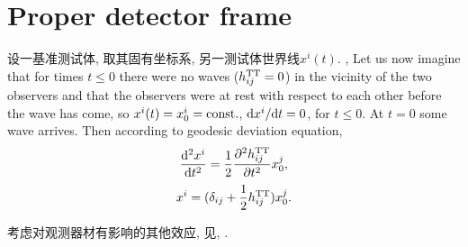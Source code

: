 \section{Proper detector frame}

设一基准测试体, 取其固有坐标系, 另一测试体世界线$x^{i}(t)$. \cite{Jaranowski2009}, Let us now imagine that for times $t \le 0$ there were no waves ($h^\text{TT}_{ij} = 0$) in the vicinity of the two observers and that the observers were at rest with respect to each other before the wave has come, so $x^i(t) = x^i_0 = \text{const.}$, $\mathrm{d} x^i/\mathrm{d} t = 0$, for $t \le 0$. At $t = 0$ some wave arrives. Then according to geodesic deviation equation,
\begin{equation}
    \frac{\mathrm{d}^2x^i}{\mathrm{d} t^2}=\frac{1}{2}\frac{\partial^2h^\text{TT}_{ij}}{\partial t^2}x^j_0,
\end{equation}
\begin{equation}
    x^i=(\delta_{ij}+\frac{1}{2}h^\text{TT}_{ij})x^j_0.
\end{equation}

考虑对观测器材有影响的其他效应, 见\cite{Maggiore2014}, \cite{Ni1978}.
